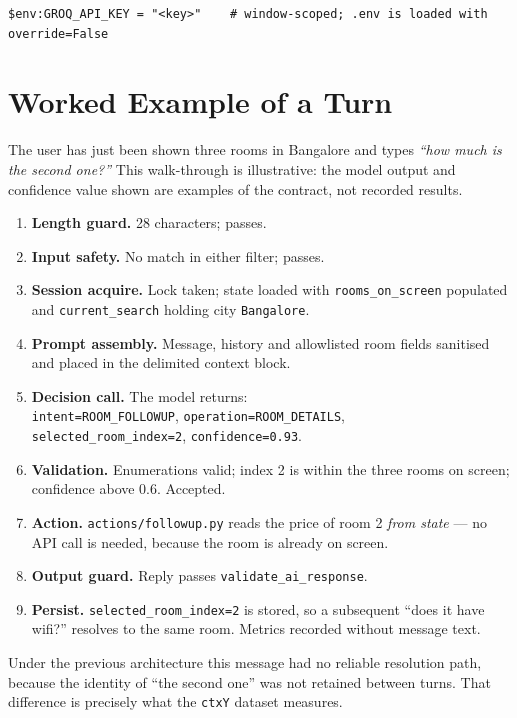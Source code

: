 \documentclass[11pt,a4paper]{article}
\newcommand{\fn}[1]{\texttt{\small #1}}
\begin{document}
\begin{lstlisting}[caption={Supplying an alternative key for one terminal session only}]
$env:GROQ_API_KEY = "<key>"    # window-scoped; .env is loaded with override=False
\end{lstlisting}

\section{Worked Example of a Turn}

The user has just been shown three rooms in Bangalore and types \emph{``how much is the second
one?''} This walk-through is illustrative: the model output and confidence value shown are
examples of the contract, not recorded results.

\begin{enumerate}[leftmargin=1.6em,itemsep=2pt]
\item \textbf{Length guard.} 28 characters; passes.
\item \textbf{Input safety.} No match in either filter; passes.
\item \textbf{Session acquire.} Lock taken; state loaded with \fn{rooms\_on\_screen}
populated and \fn{current\_search} holding city \fn{Bangalore}.
\item \textbf{Prompt assembly.} Message, history and allowlisted room fields sanitised and
placed in the delimited context block.
\item \textbf{Decision call.} The model returns:\\
\fn{intent=ROOM\_FOLLOWUP}, \fn{operation=ROOM\_DETAILS},\\
\fn{selected\_room\_index=2}, \fn{confidence=0.93}.
\item \textbf{Validation.} Enumerations valid; index 2 is within the three rooms on screen;
confidence above 0.6. Accepted.
\item \textbf{Action.} \fn{actions/followup.py} reads the price of room 2 \emph{from state} ---
no API call is needed, because the room is already on screen.
\item \textbf{Output guard.} Reply passes \fn{validate\_ai\_response}.
\item \textbf{Persist.} \fn{selected\_room\_index=2} is stored, so a subsequent ``does it have
wifi?'' resolves to the same room. Metrics recorded without message text.
\end{enumerate}

Under the previous architecture this message had no reliable resolution path, because the
identity of ``the second one'' was not retained between turns. That difference is precisely
what the \fn{ctxY} dataset measures.
\end{document}
